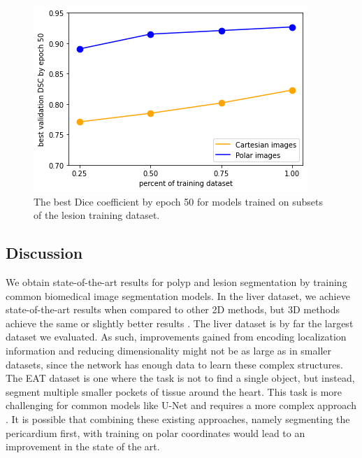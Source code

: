 		\begin{figure}[h]
		\centering
		\includegraphics[width=0.65\linewidth]{images/4/dsc-vs-dataset-percent}
		\caption{The best Dice coefficient by epoch 50 for models trained on subsets of the lesion training dataset.}
		\label{fig:dataset-vs-dsc}
	\end{figure}
	
	\subsection{Discussion}
	
We obtain state-of-the-art results for polyp and lesion segmentation by training common biomedical image segmentation models. In the liver dataset, we achieve state-of-the-art results when compared to other 2D methods, but 3D methods 
achieve the same or slightly better results \cite{valanarasuKiUNetOvercompleteConvolutional2020a}. 
The liver dataset is 
by far the largest dataset we evaluated. As such, improvements gained from 
encoding localization information and reducing dimensionality might not be as large as in smaller 
datasets, since the network has enough data to learn these complex structures.
The EAT dataset is one where the task is not to find a single object, but instead, segment multiple smaller 
pockets of tissue around the heart. This task is more challenging for common models like U-Net and 
requires a more complex approach \cite{zhangAutomaticEpicardialFat2020a}. It is possible that combining 
these existing approaches, namely segmenting the pericardium first, with training on polar coordinates 
would lead to an improvement in the state of the art.

